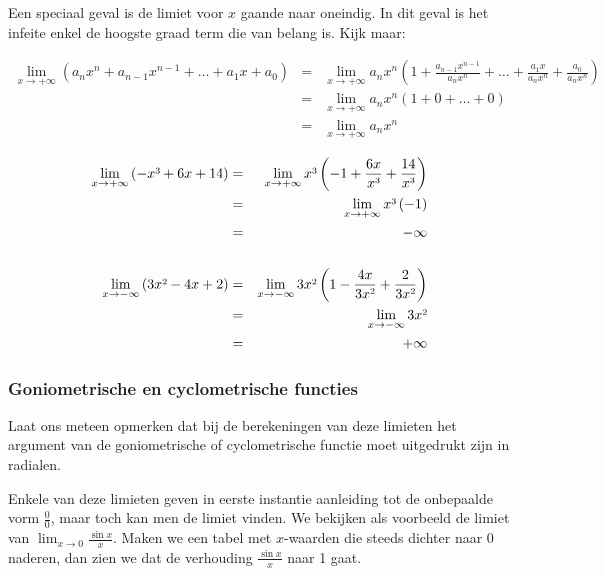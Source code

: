 Een speciaal geval is de limiet voor $x$ gaande naar oneindig.
In dit geval is het infeite enkel de hoogste graad term die van belang
is. Kijk maar:

\begin{eqnarray*}
\lim_{x\to+\infty}\left(a_{n}x^{n}+a_{n-1}x^{n-1}+\ldots+a_{1}x+a_{0}\right)&=& \lim_{x\to+\infty}a_{n}x^{n}\left(1+\frac{a_{n-1}x^{n-1}}{a_{n}x^{n}}+\ldots+\frac{a_{1}x}{a_{n}x^{n}}+\frac{a_{0}}{a_{n}x^{n}}\right) \\
&=& \lim_{x\to+\infty}a_{n}x^{n}(1+0+\ldots+0)\\
&=& \lim_{x\to+\infty}a_{n}x^{n}
\end{eqnarray*}


\begin{voorbeeld}
\begin{eqnarray*}
\lim_{x\to+\infty}\left(-x\text{\textthreesuperior}+6x+14\right)&=& \lim_{x\to+\infty}x\text{\textthreesuperior}\left(-1+\frac{6x}{x\text{\textthreesuperior}}+\frac{14}{x\text{\textthreesuperior}}\right)\\
&=& \lim_{x\to+\infty}x\text{\textthreesuperior}\left(-1\right)\\
&=&-\infty\\
& & \\
\lim_{x\to-\infty}\left(3x\text{\texttwosuperior}-4x+2\right)&=& \lim_{x\to-\infty}3x\text{\texttwosuperior}\left(1-\frac{4x}{3x\text{\texttwosuperior}}+\frac{2}{3x\text{\texttwosuperior}}\right)\\
&=&\lim_{x\to-\infty}3x\text{\texttwosuperior}\\
&=&+\infty
\end{eqnarray*}
\end{voorbeeld}

\subsubsection{Goniometrische en cyclometrische functies}

Laat ons meteen opmerken dat bij de berekeningen van deze limieten
het argument van de goniometrische of cyclometrische functie moet
uitgedrukt zijn in radialen. 

Enkele van deze limieten geven in eerste instantie aanleiding
tot de onbepaalde vorm $\frac{0}{0}$, maar toch kan men de limiet
vinden. We bekijken als voorbeeld de limiet van $ \lim_{x\to0}\frac{\sin x}{x}$.
Maken we een tabel met $x$-waarden die steeds dichter naar $0$ naderen,
dan zien we dat de verhouding $\frac{\sin x}{x}$ naar 1 gaat.

